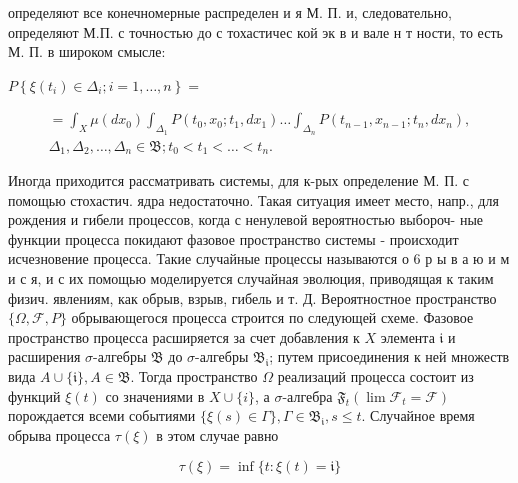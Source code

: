 \documentclass[10pt]{article}
\begin{document}
определяют все конечномерные распределен и я М. П. и, следовательно, определяют М.П. с точностью до с тохастичес кой эк в и вале н т ности, то есть М. П. в широком смысле:



$P\left\{\xi\left(t_{i}\right) \in \Delta_{i} ; i=1, \ldots, n\right\}=$



\[

\begin{gathered}

=\int_{X} \mu\left(d x_{0}\right) \int_{\Delta_{1}} P\left(t_{0}, x_{0} ; t_{1}, d x_{1}\right) \ldots \int_{\Delta_{n}} P\left(t_{n-1}, x_{n-1} ; t_{n}, d x_{n}\right), \\

\Delta_{1}, \Delta_{2}, \ldots, \Delta_{n} \in \mathfrak{B} ; t_{0}<t_{1}<\ldots<t_{n} .

\end{gathered}

\]



Иногда приходится рассматривать системы, для к-рых определение М. П. с помощью стохастич. ядра недостаточно. Такая ситуация имеет место, напр., для рождения и гибели процессов, когда с ненулевой вероятностью выбороч- ные функции процесса покидают фазовое пространство системы - происходит исчезновение процесса. Такие случайные процессы называются о 6 р ы в а ю и м и с я, и с их помощью моделируется случайная эволюция, приводящая к таким физич. явлениям, как обрыв, взрыв, гибель и т. Д. Вероятностное пространство $\{\Omega, \mathscr{F}, P\}$ обрывающегося процесса строится по следующей схеме. Фазовое пространство процесса расширяется за счет добавления к $X$ элемента $\mathfrak{i}$ и расширения $\sigma$-алгебры $\mathfrak{B}$ до $\sigma$-алгебры $\mathfrak{B}_{\mathfrak{i}}$; путем присоединения к ней множеств вида $A \cup\{\mathfrak{i}\}, A \in \mathfrak{B}$. Тогда пространство $\Omega$ реализаций процесса состоит из функций $\xi(t)$ со значениями в $X \cup\{i\}$, а $\sigma$-алгебра $\mathfrak{F}_{t}\left(\lim \mathscr{F}_{t}=\mathscr{F}\right)$ порождается всеми событиями $\{\xi(s) \in \Gamma\}, \Gamma \in \mathfrak{B}_{\mathfrak{i}}, s \leqslant t$. Случайное время обрыва процесса $\tau(\xi)$ в этом случае равно



\[

\tau(\xi)=\inf \{t: \xi(t)=\mathfrak{i}\}

\]
\end{document}
